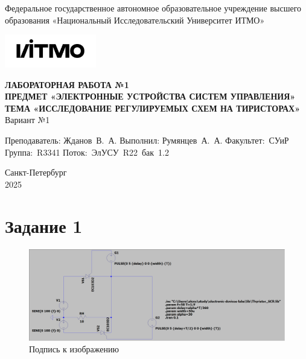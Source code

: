 \documentclass[a4paper, 12pt]{article}
\begin{document}
    \begin{titlepage}

        \begin{center}
        Федеральное государственное автономное образовательное учреждение высшего образования
        «Национальный Исследовательский Университет ИТМО»
        \vfill
        
        \includegraphics[width=0.3\textwidth]{itmo.png} %

        {\large\bf ЛАБОРАТОРНАЯ РАБОТА №1}\\
        {\large\bf ПРЕДМЕТ «ЭЛЕКТРОННЫЕ УСТРОЙСТВА СИСТЕМ УПРАВЛЕНИЯ»}\\
        {\large\bf ТЕМА «ИССЛЕДОВАНИЕ РЕГУЛИРУЕМЫХ СХЕМ НА ТИРИСТОРАХ»}\\
        Вариант №1
        \vfill

        \begin{flushright}
            \begin{minipage}{.45\textwidth}
            {
                \hbox{Преподаватель:}
                \hbox{Жданов В. А.}
                \hbox{}
                \hbox{Выполнил:}
                \hbox{Румянцев А. А.}
                \hbox{}
                \hbox{Факультет: СУиР}
                \hbox{Группа: R3341}
                \hbox{Поток: ЭлУСУ R22 бак 1.2}
            }
            \end{minipage}
        \end{flushright}
        \vfill
  
        Санкт-Петербург\\
        2025
        \end{center}
    \end{titlepage}
    
    \tableofcontents

    \newpage
    \section{Задание 1}
    \begin{figure}[H]
        \centering
        \includegraphics[scale=0.22]{scheme1.png}
        \captionsetup{skip=0pt}
        \caption{Подпись к изображению}
        \label{fig:scheme1}
    \end{figure}
\end{document}
